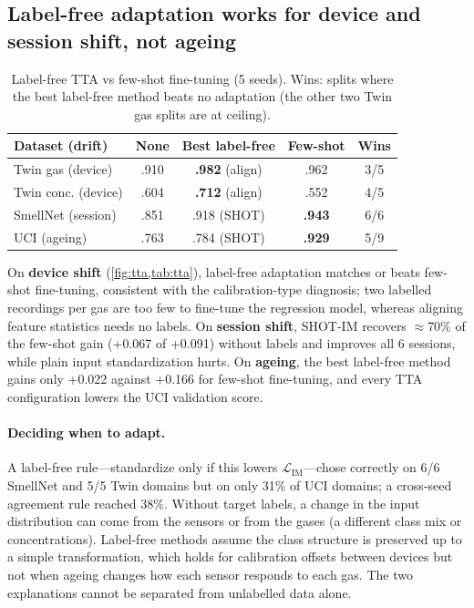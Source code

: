 \documentclass[10pt,twocolumn,letterpaper]{article}
\begin{document}
\subsection{Label-free adaptation works for device and session shift, not ageing}
\label{sec:tta}
\begin{table}[t]
\centering\footnotesize\setlength{\tabcolsep}{3pt}
\begin{tabular}{@{}lcccc@{}}
\toprule
Dataset (drift) & None & Best label-free & Few-shot & Wins \\
\midrule
Twin gas (device) & .910 & \textbf{.982} (align) & .962 & 3/5 \\
Twin conc. (device) & .604 & \textbf{.712} (align) & .552 & 4/5 \\
SmellNet (session) & .851 & .918 (SHOT) & \textbf{.943} & 6/6 \\
UCI (ageing) & .763 & .784 (SHOT) & \textbf{.929} & 5/9 \\
\bottomrule
\end{tabular}
\caption{Label-free TTA vs few-shot fine-tuning (5 seeds). Wins: splits where the best label-free method beats no
adaptation (the other two Twin gas splits are at ceiling).}
\label{tab:tta}
\end{table}
On \textbf{device shift} (\cref{fig:tta,tab:tta}), label-free adaptation matches or beats few-shot fine-tuning,
consistent with the calibration-type diagnosis; two labelled recordings per gas are too few to fine-tune the
regression model, whereas aligning feature statistics needs no labels. On \textbf{session shift}, SHOT-IM recovers
$\approx$70\% of the few-shot gain (+0.067 of +0.091) without labels and improves all 6 sessions, while plain input
standardization hurts. On \textbf{ageing}, the best label-free method gains only +0.022 against +0.166 for few-shot
fine-tuning, and every TTA configuration lowers the UCI validation score.

\paragraph{Deciding when to adapt.} A label-free rule---standardize only if this lowers $\mathcal{L}_{\text{IM}}$---chose
correctly on 6/6 SmellNet and 5/5 Twin domains but on only 31\% of UCI domains; a cross-seed agreement rule reached
38\%. Without target labels, a change in the input distribution can come from the sensors or from the gases (a
different class mix or concentrations). Label-free methods assume the class structure is preserved up to a simple
transformation, which holds for calibration offsets between devices but not when ageing changes how each sensor
responds to each gas. The two explanations cannot be separated from unlabelled data alone.
\end{document}
